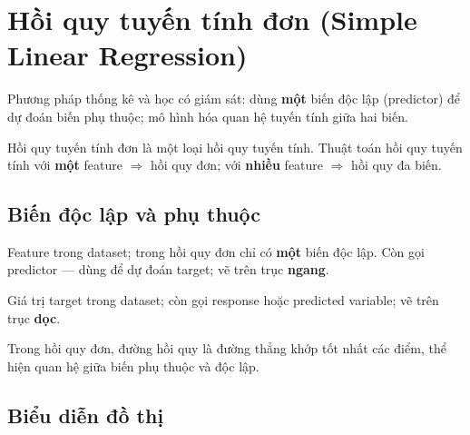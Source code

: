 \section{Hồi quy tuyến tính đơn (Simple Linear Regression)}
\label{sec:simple-linear-regression}

\begin{dinhnghia}[title={Hồi quy tuyến tính đơn}]
Phương pháp thống kê và học có giám sát: dùng \textbf{một} biến độc lập (predictor) để dự đoán biến phụ thuộc; mô hình hóa quan hệ tuyến tính giữa hai biến.
\end{dinhnghia}

\begin{phuongphap}[title={Liên hệ với hồi quy tuyến tính}]
Hồi quy tuyến tính đơn là một loại hồi quy tuyến tính.
Thuật toán hồi quy tuyến tính với \textbf{một} feature $\Rightarrow$ hồi quy đơn; với \textbf{nhiều} feature $\Rightarrow$ hồi quy đa biến.
\end{phuongphap}

\subsection{Biến độc lập và phụ thuộc}

\begin{dinhnghia}[title={Biến độc lập (Independent Variable)}]
Feature trong dataset; trong hồi quy đơn chỉ có \textbf{một} biến độc lập.
Còn gọi predictor --- dùng để dự đoán target; vẽ trên trục \textbf{ngang}.
\end{dinhnghia}

\begin{dinhnghia}[title={Biến phụ thuộc (Dependent Variable)}]
Giá trị target trong dataset; còn gọi response hoặc predicted variable; vẽ trên trục \textbf{dọc}.
\end{dinhnghia}

\begin{dinhnghia}[title={Đường hồi quy (Line of Regression)}]
Trong hồi quy đơn, đường hồi quy là đường thẳng khớp tốt nhất các điểm, thể hiện quan hệ giữa biến phụ thuộc và độc lập.
\end{dinhnghia}

\subsection{Biểu diễn đồ thị}

